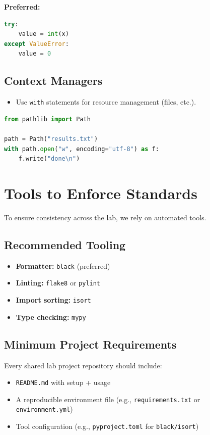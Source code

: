 \documentclass[11pt]{article}
\begin{document}
\textbf{Preferred:}
\begin{lstlisting}[language=Python]
try:
    value = int(x)
except ValueError:
    value = 0
\end{lstlisting}

\subsection{Context Managers}
\begin{itemize}[label={-},leftmargin=2em,labelsep=0.6em,itemsep=0.2em]
  \item Use \texttt{with} statements for resource management (files, etc.).
\end{itemize}

\begin{lstlisting}[language=Python]
from pathlib import Path

path = Path("results.txt")
with path.open("w", encoding="utf-8") as f:
    f.write("done\n")
\end{lstlisting}

\section{Tools to Enforce Standards}

To ensure consistency across the lab, we rely on automated tools.

\subsection{Recommended Tooling}
\begin{itemize}[label={-},leftmargin=2em,labelsep=0.6em,itemsep=0.2em]
  \item \textbf{Formatter:} \texttt{black} (preferred)
  \item \textbf{Linting:} \texttt{flake8} or \texttt{pylint}
  \item \textbf{Import sorting:} \texttt{isort}
  \item \textbf{Type checking:} \texttt{mypy}
\end{itemize}

\subsection{Minimum Project Requirements}
Every shared lab project repository should include:
\begin{itemize}[label={-},leftmargin=2em,labelsep=0.6em,itemsep=0.2em]
  \item \texttt{README.md} with setup + usage
  \item A reproducible environment file (e.g., \texttt{requirements.txt} or \texttt{environment.yml})
  \item Tool configuration (e.g., \texttt{pyproject.toml} for \texttt{black/isort})
\end{itemize}
\end{document}
